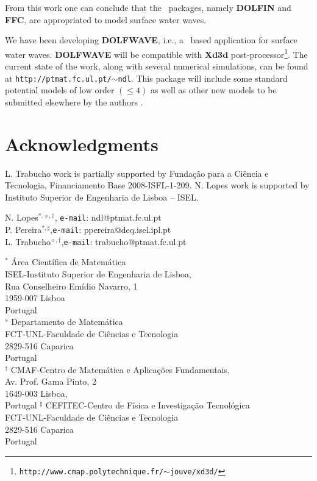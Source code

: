 From this work one can conclude that the \fenics\, packages,
namely {\bf DOLFIN} and {\bf FFC}, are appropriated to model
surface water waves.
   
We have been developing {\bf DOLFWAVE}, i.e., a \fenics\, based application for 
surface water waves.   
{\bf DOLFWAVE} will be compatible with {\bf Xd3d}
post-processor\footnote{{\tt http://www.cmap.polytechnique.fr/\(\sim\)jouve/xd3d/}}.    
The current state of the work, 
along with several numerical simulations,  
can be found at  
{\tt http://ptmat.fc.ul.pt/\(\sim\)ndl}.
This package will include some  standard potential models of low
 order  \((\leq 4)\)   as well as other new models to be submitted
elsewhere by the authors \cite{LopPer09}.




\section{Acknowledgments}
L. Trabucho work is partially supported by Funda\c{c}\~{a}o para
a Ci\^{e}ncia e Tecnologia, 
Financiamento Base 2008-ISFL-1-209. 
N. Lopes work is supported by  Instituto Superior de
Engenharia de Lisboa -- ISEL.  

\begin{center}
N. Lopes\(^{\ast,\diamond,\dagger}\), {\tt e-mail}: ndl@ptmat.fc.ul.pt\\
\quad P. Pereira\(^{\ast,\sharp}\),{\tt e-mail}: ppereira@deq.isel.ipl.pt\\
L. Trabucho\(^{\diamond,\dagger}\),{\tt e-mail}: trabucho@ptmat.fc.ul.pt   
\end{center}
\vskip0.2in
{
\noindent \(^{\ast}\) \'{A}rea Cient\'{i}fica de Matem\'{a}tica\\
ISEL-Instituto Superior de Engenharia de Lisboa,
\\
Rua Conselheiro Em\'{i}dio Navarro, 1\\
1959-007 Lisboa\\
Portugal\\
}
\vskip0.2in
{
\noindent \(^{\diamond}\)
Departamento de Matem\'{a}tica\\
FCT-UNL-Faculdade de Ci\^{e}ncias e Tecnologia\\
2829-516 Caparica\\
Portugal\\
}
\vskip0.2in
{
\noindent \(^{\dagger}\)
CMAF-Centro de Matem\'{a}tica e Aplica\c{c}\~{o}es
Fundamentais,\\
Av. Prof. Gama Pinto, 2\\
1649-003 Lisboa,\\
Portugal
}
\vskip0.2in
{
\noindent \(^{\sharp}\)
CEFITEC-Centro de F\'{i}sica e Investiga\c{c}\~ao Tecnol\'{o}gica\\
FCT-UNL-Faculdade de Ci\^{e}ncias e Tecnologia\\
2829-516 Caparica\\
Portugal\\
}
\vfill

